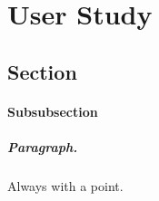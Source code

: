 \chapter{User Study}
\section{Section}
%
\subsubsection{Subsubsection}

\paragraph{Paragraph.} Always with a point.

